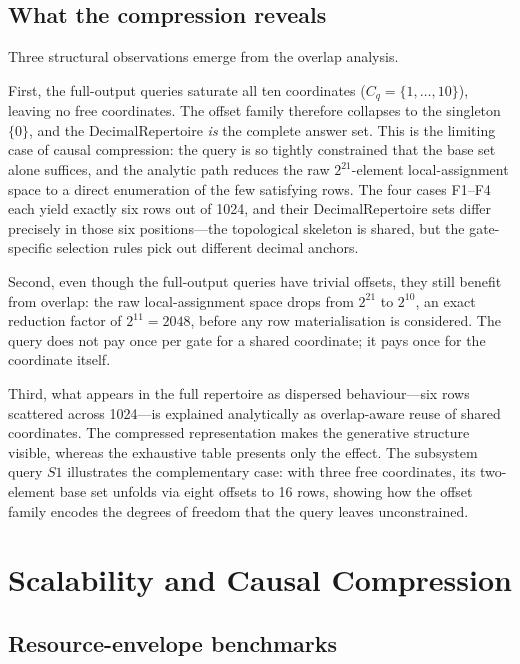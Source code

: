 \documentclass[11pt]{article}
\begin{document}
\subsection{What the compression reveals}\label{sec:compression-reveals}

Three structural observations emerge from the overlap analysis.

First, the full-output queries saturate all ten coordinates
($C_q = \{1,\ldots,10\}$), leaving no free coordinates.  The offset
family therefore collapses to the singleton $\{0\}$, and the
DecimalRepertoire \emph{is} the complete answer set.  This is the
limiting case of causal compression: the query is so tightly constrained
that the base set alone suffices, and the analytic path reduces the raw
$2^{21}$-element local-assignment space to a direct enumeration of the
few satisfying rows.  The four cases F1--F4 each yield exactly six rows
out of 1024, and their DecimalRepertoire sets differ precisely in those
six positions---the topological skeleton is shared, but the gate-specific
selection rules pick out different decimal anchors.

Second, even though the full-output queries have trivial offsets, they
still benefit from overlap: the raw local-assignment space drops from
$2^{21}$ to $2^{10}$, an exact reduction factor of $2^{11}=2048$, before
any row materialisation is considered.  The query does not pay once per
gate for a shared coordinate; it pays once for the coordinate itself.

Third, what appears in the full repertoire as dispersed behaviour---six
rows scattered across 1024---is explained analytically as overlap-aware
reuse of shared coordinates.  The compressed representation makes the
generative structure visible, whereas the exhaustive table presents only
the effect.  The subsystem query $S1$ illustrates the complementary case:
with three free coordinates, its two-element base set unfolds via eight
offsets to 16 rows, showing how the offset family encodes the degrees of
freedom that the query leaves unconstrained.


\section{Scalability and Causal Compression}\label{sec:scalability}

\subsection{Resource-envelope benchmarks}\label{sec:benchmarks}
\end{document}
